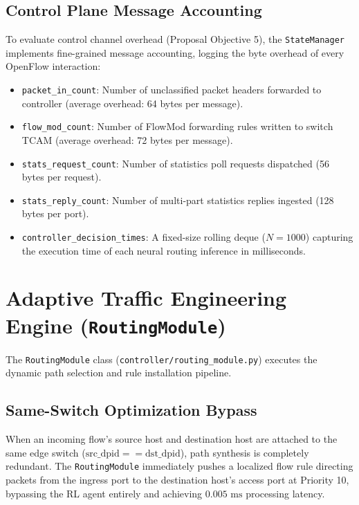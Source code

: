 \documentclass[12pt,a4paper,oneside]{report}
\begin{document}
\subsection{Control Plane Message Accounting}
To evaluate control channel overhead (Proposal Objective 5), the \texttt{StateManager} implements fine-grained message accounting, logging the byte overhead of every OpenFlow interaction:
\begin{itemize}
    \item \texttt{packet\_in\_count}: Number of unclassified packet headers forwarded to controller (average overhead: 64 bytes per message).
    \item \texttt{flow\_mod\_count}: Number of FlowMod forwarding rules written to switch TCAM (average overhead: 72 bytes per message).
    \item \texttt{stats\_request\_count}: Number of statistics poll requests dispatched (56 bytes per request).
    \item \texttt{stats\_reply\_count}: Number of multi-part statistics replies ingested (128 bytes per port).
    \item \texttt{controller\_decision\_times}: A fixed-size rolling deque ($N=1000$) capturing the execution time of each neural routing inference in milliseconds.
\end{itemize}

\section{Adaptive Traffic Engineering Engine (\texttt{RoutingModule})}
The \texttt{RoutingModule} class (\texttt{controller/routing\_module.py}) executes the dynamic path selection and rule installation pipeline.

\subsection{Same-Switch Optimization Bypass}
When an incoming flow's source host and destination host are attached to the same edge switch ($\text{src\_dpid} == \text{dst\_dpid}$), path synthesis is completely redundant. The \texttt{RoutingModule} immediately pushes a localized flow rule directing packets from the ingress port to the destination host's access port at Priority 10, bypassing the RL agent entirely and achieving $0.005\text{ ms}$ processing latency.
\end{document}
